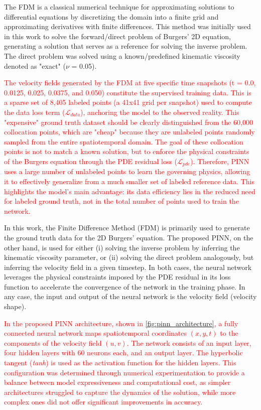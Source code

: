 \documentclass[12pt,fleqn]{article}
\begin{document}
The FDM is a classical numerical technique for approximating solutions to differential equations by discretizing the domain into a finite grid and approximating derivatives with finite differences. This method was initially used in this work to solve the forward/direct problem of Burgers' 2D equation, generating a solution that serves as a reference for solving the inverse problem. The direct problem was solved using a known/predefined kinematic viscosity denoted as "exact" ($\nu$ = 0.05).

\textcolor{red}{The velocity fields generated by the FDM at five specific time snapshots (t = 0.0, 0.0125, 0.025, 0.0375, and 0.050) constitute the supervised training data. This is a sparse set of 8,405 labeled points (a 41x41 grid per snapshot) used to compute the data loss term ($\mathcal{L}_{data}$), anchoring the model to the observed reality. This "expensive" ground truth dataset should be clearly distinguished from the 60,000 collocation points, which are "cheap" because they are unlabeled points randomly sampled from the entire spatiotemporal domain. The goal of these collocation points is not to match a known solution, but to enforce the physical constraints of the Burgers equation through the PDE residual loss ($\mathcal{L}_{pde}$). Therefore, PINN uses a large number of unlabeled points to learn the governing physics, allowing it to effectively generalize from a much smaller set of labeled reference data. This highlights the model's main advantage: its data efficiency lies in the reduced need for labeled ground truth, not in the total number of points used to train the network.}


In this work, the Finite Difference Method (FDM) is primarily used to generate the ground truth data for the 2D Burgers' equation. The proposed PINN, on the other hand, is used for either (i) solving the inverse problem by inferring the kinematic viscosity parameter, or (ii) solving the direct problem analogously, but inferring the velocity field in a given timestep. In both cases, the neural network leverages the physical constraints imposed by the PDE residual in its loss function to accelerate the convergence of the network in the training phase. In any case, the input and output of the neural network is the velocity field (velocity shape).

\textcolor{red}{In the proposed PINN architecture, shown in \autoref{fig:pinn_architecture}, a fully connected neural network maps spatiotemporal coordinates $(x, y, t)$ to the components of the velocity field $(u, v)$. The network consists of an input layer, four hidden layers with 60 neurons each, and an output layer. The hyperbolic tangent ({\it tanh}) is used as the activation function for the hidden layers. This configuration was determined through numerical experimentation to provide a balance between model expressiveness and computational cost, as simpler architectures struggled to capture the dynamics of the solution, while more complex ones did not offer significant improvements in accuracy.}
\end{document}
